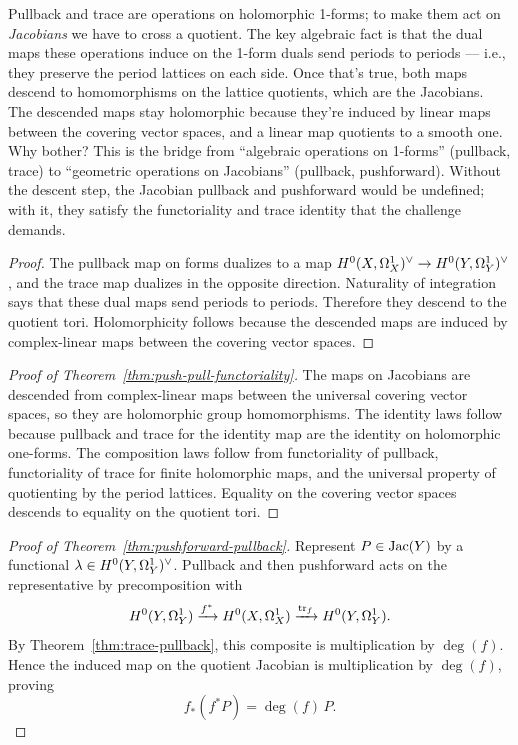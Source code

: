 \begin{layman}
Pullback and trace are operations on holomorphic 1-forms; to make them
act on \emph{Jacobians} we have to cross a quotient. The key algebraic
fact is that the dual maps these operations induce on the 1-form duals
send periods to periods --- i.e., they preserve the period lattices on
each side. Once that's true, both maps descend to homomorphisms
on the lattice quotients, which are the Jacobians. The descended maps
stay holomorphic because they're induced by linear maps between the
covering vector spaces, and a linear map quotients to a smooth one.
Why bother? This is the bridge from ``algebraic operations on 1-forms''
(pullback, trace) to ``geometric operations on Jacobians'' (pullback,
pushforward). Without the descent step, the Jacobian pullback and
pushforward would be undefined; with it, they satisfy the functoriality
and trace identity that the challenge demands.
\end{layman}

\begin{proof}\leanok
The pullback map on forms dualizes to a map \(H^{0}(X,\Omega^{1}_{X})^{\vee}\to H^{0}(Y,\Omega^{1}_{Y})^{\vee}\), and the
trace map dualizes in the opposite direction. Naturality of integration says
that these dual maps send periods to periods. Therefore they descend to the
quotient tori. Holomorphicity follows because the descended maps are induced
by complex-linear maps between the covering vector spaces.
\end{proof}

\begin{proof}[Proof of Theorem~\ref{thm:push-pull-functoriality}]\leanok
The maps on Jacobians are descended from complex-linear maps between the
universal covering vector spaces, so they are holomorphic group homomorphisms.
The identity laws follow because pullback and trace for the identity map are
the identity on holomorphic one-forms. The composition laws follow from
functoriality of pullback, functoriality of trace for finite holomorphic maps,
and the universal property of quotienting by the period lattices. Equality on
the covering vector spaces descends to equality on the quotient tori.
\end{proof}

\begin{proof}[Proof of Theorem~\ref{thm:pushforward-pullback}]\leanok
Represent \(P\in\operatorname{Jac}(Y)\) by a functional \(\lambda\in H^{0}(Y,\Omega^{1}_{Y})^{\vee}\). Pullback and
then pushforward acts on the representative by precomposition with
\[
  H^{0}(Y,\Omega^{1}_{Y}) \xrightarrow{f^{*}} H^{0}(X,\Omega^{1}_{X}) \xrightarrow{\operatorname{tr}_f} H^{0}(Y,\Omega^{1}_{Y}) .
\]
By Theorem~\ref{thm:trace-pullback}, this composite is multiplication by
\(\deg(f)\). Hence the induced map on the quotient Jacobian is multiplication
by \(\deg(f)\), proving
\[
  f_*(f^{*}P)=\deg(f)\,P.
\]
\end{proof}


